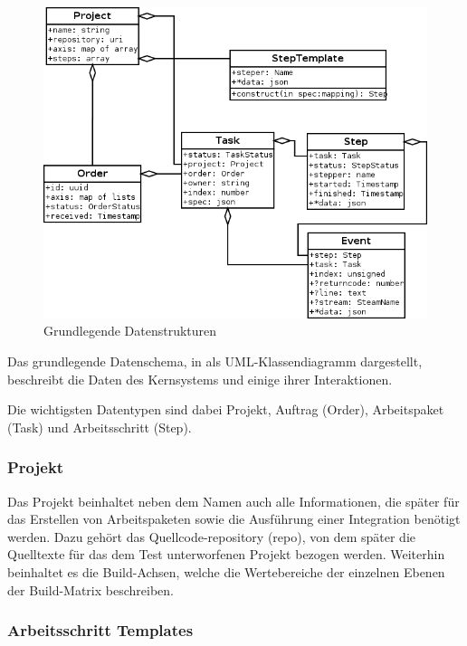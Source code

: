 \begin{figure}[ht] 
  \centering
  \includegraphics[width=\textwidth]{imageinput/datenstrukturen-step-templates.png}
  \caption{Grundlegende Datenstrukturen}
  \label{fig:datenstrukturen}
\end{figure}

Das grundlegende Datenschema, in  als \ac{UML}-Klassendiagramm dargestellt,
beschreibt die Daten des Kernsystems und einige ihrer Interaktionen.

Die wichtigsten Datentypen sind dabei Projekt, Auftrag (Order),
Arbeitspaket (Task) und Arbeitsschritt (Step).

\subsubsection{Projekt}

Das Projekt beinhaltet neben dem Namen auch alle Informationen,
die später für das Erstellen von Arbeitspaketen sowie
die Ausführung einer Integration benötigt werden.
Dazu gehört das Quellcode-repository (repo), von dem später
die Quelltexte für das dem Test unterworfenen Projekt bezogen werden.
Weiterhin beinhaltet es die Build-Achsen,
welche die Wertebereiche der einzelnen Ebenen der Build-Matrix
beschreiben.

\subsubsection{Arbeitsschritt Templates}

